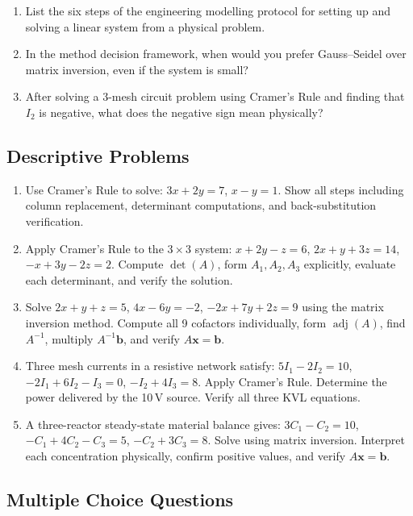 \documentclass[12pt,a4paper]{article}
\begin{document}
\begin{enumerate}[noitemsep, label=\textbf{V\arabic*.}, start=7]
  \item List the six steps of the engineering modelling protocol for setting up and solving a linear system from a physical problem.
  \item In the method decision framework, when would you prefer Gauss--Seidel over matrix inversion, even if the system is small?
  \item After solving a 3-mesh circuit problem using Cramer's Rule and finding that $I_2$ is negative, what does the negative sign mean physically?
\end{enumerate}

\subsection*{Descriptive Problems}

\begin{enumerate}[noitemsep, label=\textbf{D\arabic*.}]
  \item Use Cramer's Rule to solve: $3x+2y=7$, $x-y=1$. Show all steps including column replacement, determinant computations, and back-substitution verification.
  \item Apply Cramer's Rule to the $3\times3$ system: $x+2y-z=6$, $2x+y+3z=14$, $-x+3y-2z=2$. Compute $\det(A)$, form $A_1,A_2,A_3$ explicitly, evaluate each determinant, and verify the solution.
  \item Solve $2x+y+z=5$, $4x-6y=−2$, $-2x+7y+2z=9$ using the matrix inversion method. Compute all 9 cofactors individually, form $\operatorname{adj}(A)$, find $A^{-1}$, multiply $A^{-1}\mathbf{b}$, and verify $A\mathbf{x}=\mathbf{b}$.
  \item Three mesh currents in a resistive network satisfy: $5I_1-2I_2=10$, $-2I_1+6I_2-I_3=0$, $-I_2+4I_3=8$. Apply Cramer's Rule. Determine the power delivered by the 10\,V source. Verify all three KVL equations.
  \item A three-reactor steady-state material balance gives: $3C_1-C_2=10$, $-C_1+4C_2-C_3=5$, $-C_2+3C_3=8$. Solve using matrix inversion. Interpret each concentration physically, confirm positive values, and verify $A\mathbf{x}=\mathbf{b}$.
\end{enumerate}

\subsection*{Multiple Choice Questions}
\end{document}
